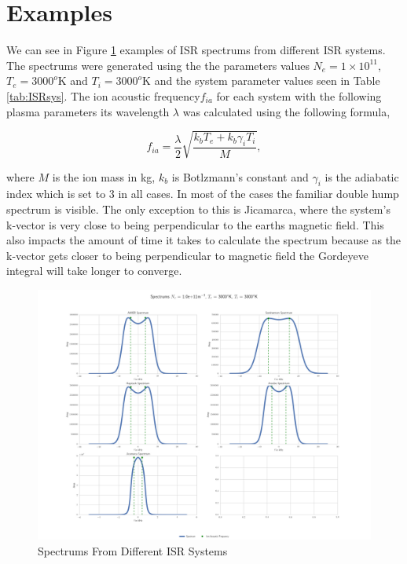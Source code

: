 \section*{Examples}
We can see in Figure \ref{fig:diffspectrums} examples of ISR spectrums from different ISR systems. The spectrums were generated using the the parameters values $N_e=1\times10^{11}$, $T_e=3000^o$K and $T_i=3000^o$K and the system parameter values seen in Table \ref{tab:ISRsys}. The ion acoustic frequency$f_{ia}$ for each system with the following plasma parameters its wavelength $\lambda$ was calculated using the following formula,

\begin{equation}
\label{eq:iaf}
f_{ia} = \frac{\lambda}{2}\sqrt{\frac{k_bT_e +k_b\gamma_iT_i}{M}},
\end{equation}

\noindent where $M$ is the ion mass in kg, $k_b$ is Botlzmann's constant and $\gamma_i$ is the adiabatic index which is set to 3 in all cases. In most of the cases the familiar double hump spectrum is visible. The only exception to this is Jicamarca, where the system's k-vector is very close to being perpendicular to the earths magnetic field. This also impacts the amount of time it takes to calculate the spectrum because as the k-vector gets closer to being perpendicular to magnetic field the Gordeyeve integral will take longer to converge.
\begin{figure}[!h]
\centering
\includegraphics[width=7.0in]{DifferentSystems}

\caption{Spectrums From Different ISR Systems}
\label{fig:diffspectrums}
\end{figure}


